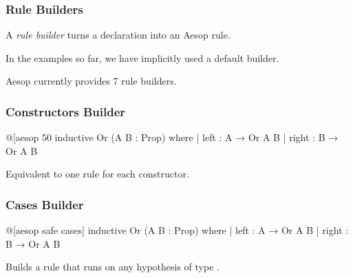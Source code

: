 \documentclass[xetex]{beamer}
\newcommand{\orange}[1]{\textcolor{orange}{#1}}
\newenvironment{rapppic}{\begin{tikzpicture}[outer sep=auto, level distance=2em]}{\end{tikzpicture}}
\newenvironment{rapp}{%
  \begin{tcolorbox}
  \begin{center}
  \begin{rapppic}
}{
  \end{rapppic}
  \end{center}
  \end{tcolorbox}%
}
\begin{document}
\begin{frame}
  \frametitle{Rule Builders}

  A \emph{rule builder} turns a declaration into an Aesop rule.

  In the examples so far, we have implicitly used a default builder.

  Aesop currently provides 7 rule builders.
\end{frame}


\begin{frame}[fragile]
  \frametitle{Constructors Builder}

  \begin{leancode}
    @[aesop 50%
    inductive Or (A B : Prop) where
      | left  : A → Or A B
      | right : B → Or A B
  \end{leancode}

  Equivalent to one  rule for each constructor.
\end{frame}

\begin{frame}[fragile]
  \frametitle{Cases Builder}

  \begin{leancode}
    @[aesop safe cases]
    inductive Or (A B : Prop) where
      | left  : A → Or A B
      | right : B → Or A B
  \end{leancode}

  Builds a rule that runs  on any hypothesis of type .
\end{frame}

\end{document}
